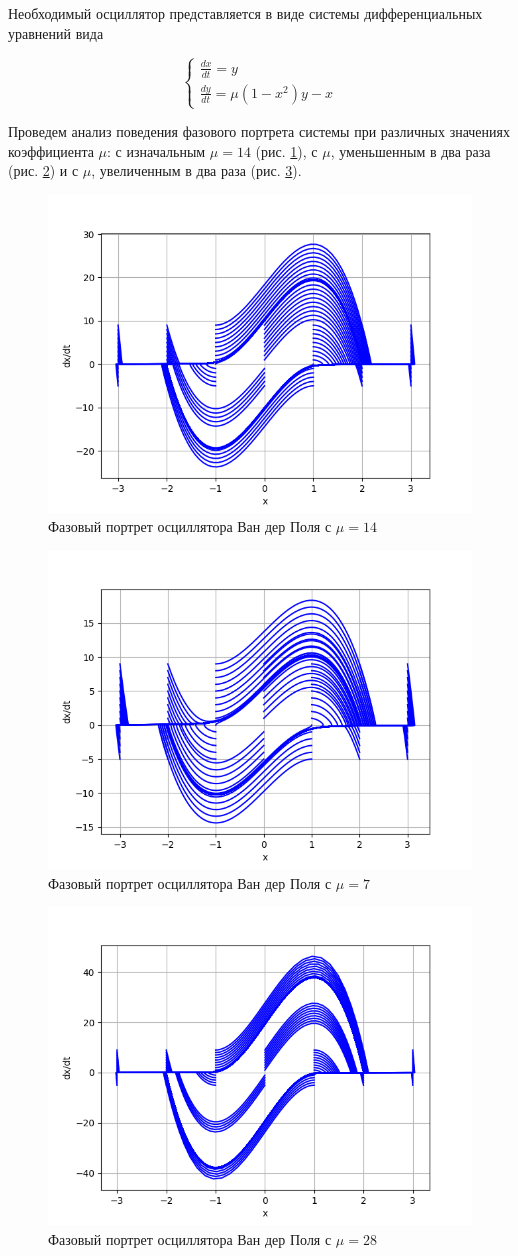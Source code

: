 Необходимый осциллятор представляется в виде системы дифференциальных уравнений вида

$$
\begin{cases}
{\frac{dx}{dt}} = y \\ 
{\frac{dy}{dt}} = \mu (1-x^2)y-x
\end{cases}
$$

Проведем анализ поведения фазового портрета системы при различных значениях коэффициента $\mu$:
с изначальным $\mu = 14$ (рис. \ref{fig:17}), с $\mu$, уменьшенным в два раза (рис. \ref{fig:18}) и с $\mu$, увеличенным в два раза (рис. \ref{fig:19}).

\begin{figure}[H]
	\centering
	\includegraphics[width=0.6\linewidth]{body/images/Oscillator-with-mu.png}
	\caption{Фазовый портрет осциллятора Ван дер Поля с $\mu=14$}
	\label{fig:17}
\end{figure}

\begin{figure}[H]
	\centering
	\includegraphics[width=0.6\linewidth]{body/images/Oscillator-with-0.5mu.png}
	\caption{Фазовый портрет осциллятора Ван дер Поля с $\mu=7$}
	\label{fig:18}
\end{figure}

\begin{figure}[H]
	\centering
	\includegraphics[width=0.6\linewidth]{body/images/Oscillator-with-2mu.png}
	\caption{Фазовый портрет осциллятора Ван дер Поля с $\mu=28$}
	\label{fig:19}
\end{figure}

